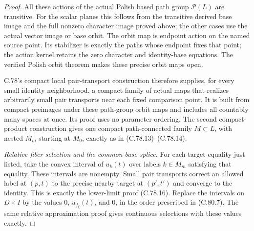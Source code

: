 \begin{proof}
All these actions of the actual Polish based
path group $\mathscr P(L)$ are transitive.
For the scalar planes this follows from the
transitive derived base image and the full
nonzero character image proved above; the
other cases use the actual vector image or
base orbit. The orbit map is endpoint action
on the named source point. Its stabilizer
is exactly the paths whose endpoint fixes
that point; the action kernel retains the
zero character and identity-base equations.
The verified Polish orbit theorem makes
these precise orbit maps open.

C.78's compact local pair-transport construction
therefore supplies, for every small identity
neighborhood, a compact family of actual maps
that realizes arbitrarily small pair transports
near each fixed comparison point. It is built
from compact preimages under these path-group
orbit maps and includes all countably many
spaces at once. Its proof uses no parameter
ordering. The second compact-product construction
gives one compact path-connected family $M\subset L$,
with nested $M_m$ starting at $M_0$, exactly
as in (C.78.13)--(C.78.14).

\emph{Relative fiber selection and the common-base splice.}
For each target equality just listed, take
the convex interval of $u_k(t)$ over labels
$k\in M_m$ satisfying that equality. These
intervals are nonempty. Small pair transports
correct an allowed label at $(p,t)$ to the
precise nearby target at $(p',t')$ and converge
to the identity. This is exactly the lower-limit
proof (C.78.16). Replace the intervals on
$D\times I$ by the values $0$, $u_{f_\xi}(t)$,
and $0$, in the order prescribed in (C.80.7).
The same relative approximation proof gives
continuous selections with these values exactly.


\end{proof}
